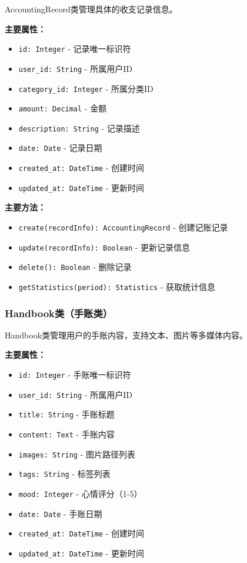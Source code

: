 \documentclass[a4paper]{article}
\begin{document}
AccountingRecord类管理具体的收支记录信息。

\textbf{主要属性：}
\begin{itemize}
    \item \texttt{id: Integer} - 记录唯一标识符
    \item \texttt{user\_id: String} - 所属用户ID
    \item \texttt{category\_id: Integer} - 所属分类ID
    \item \texttt{amount: Decimal} - 金额
    \item \texttt{description: String} - 记录描述
    \item \texttt{date: Date} - 记录日期
    \item \texttt{created\_at: DateTime} - 创建时间
    \item \texttt{updated\_at: DateTime} - 更新时间
\end{itemize}

\textbf{主要方法：}
\begin{itemize}
    \item \texttt{create(recordInfo): AccountingRecord} - 创建记账记录
    \item \texttt{update(recordInfo): Boolean} - 更新记录信息
    \item \texttt{delete(): Boolean} - 删除记录
    \item \texttt{getStatistics(period): Statistics} - 获取统计信息
\end{itemize}

\subsubsection{Handbook类（手账类）}

Handbook类管理用户的手账内容，支持文本、图片等多媒体内容。

\textbf{主要属性：}
\begin{itemize}
    \item \texttt{id: Integer} - 手账唯一标识符
    \item \texttt{user\_id: String} - 所属用户ID
    \item \texttt{title: String} - 手账标题
    \item \texttt{content: Text} - 手账内容
    \item \texttt{images: String} - 图片路径列表
    \item \texttt{tags: String} - 标签列表
    \item \texttt{mood: Integer} - 心情评分（1-5）
    \item \texttt{date: Date} - 手账日期
    \item \texttt{created\_at: DateTime} - 创建时间
    \item \texttt{updated\_at: DateTime} - 更新时间
\end{itemize}
\end{document}

